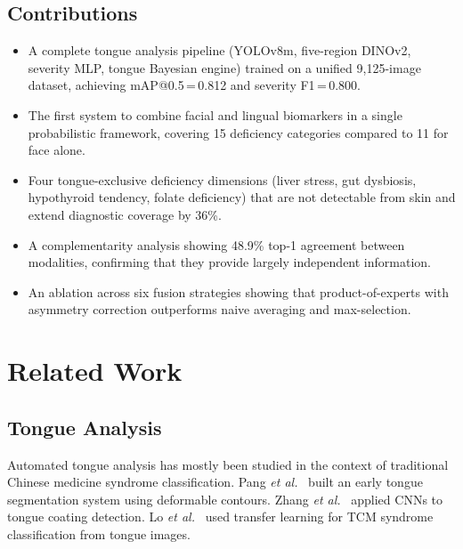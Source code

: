 \documentclass[journal]{IEEEtran}
\begin{document}
\subsection*{Contributions}

\begin{itemize}
  \item A complete tongue analysis pipeline (YOLOv8m, five-region DINOv2,
    severity MLP, tongue Bayesian engine) trained on a unified 9{,}125-image
    dataset, achieving mAP@0.5\,=\,0.812 and severity F1\,=\,0.800.

  \item The first system to combine facial and lingual biomarkers in a single
    probabilistic framework, covering 15 deficiency categories compared to 11
    for face alone.

  \item Four tongue-exclusive deficiency dimensions (liver stress, gut dysbiosis,
    hypothyroid tendency, folate deficiency) that are not detectable from skin
    and extend diagnostic coverage by 36\%.

  \item A complementarity analysis showing 48.9\%
    top-1 agreement between modalities, confirming that they provide
    largely independent information.

  \item An ablation across six fusion strategies showing that product-of-experts
    with asymmetry correction outperforms naive averaging and max-selection.
\end{itemize}

\section{Related Work}
\label{sec:related}

\subsection{Tongue Analysis}

Automated tongue analysis has mostly been studied in the context of traditional
Chinese medicine syndrome classification. Pang \textit{et al.}~\cite{pang2005}
built an early tongue segmentation system using deformable contours. Zhang
\textit{et al.}~\cite{zhang2016} applied CNNs to tongue coating detection.
Lo \textit{et al.}~\cite{lo2015} used transfer learning for TCM syndrome
classification from tongue images.
\end{document}
